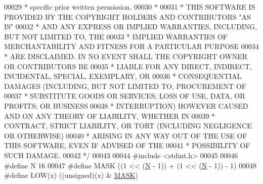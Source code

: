 \begin{DoxyCode}
00029 \textcolor{comment}{ *     specific prior written permission.}
00030 \textcolor{comment}{ *}
00031 \textcolor{comment}{ * THIS SOFTWARE IS PROVIDED BY THE COPYRIGHT HOLDERS AND CONTRIBUTORS "AS IS"}
00032 \textcolor{comment}{ * AND ANY EXPRESS OR IMPLIED WARRANTIES, INCLUDING, BUT NOT LIMITED TO, THE}
00033 \textcolor{comment}{ * IMPLIED WARRANTIES OF MERCHANTABILITY AND FITNESS FOR A PARTICULAR PURPOSE}
00034 \textcolor{comment}{ * ARE DISCLAIMED. IN NO EVENT SHALL THE COPYRIGHT OWNER OR CONTRIBUTORS BE}
00035 \textcolor{comment}{ * LIABLE FOR ANY DIRECT, INDIRECT, INCIDENTAL, SPECIAL, EXEMPLARY, OR}
00036 \textcolor{comment}{ * CONSEQUENTIAL DAMAGES (INCLUDING, BUT NOT LIMITED TO, PROCUREMENT OF}
00037 \textcolor{comment}{ * SUBSTITUTE GOODS OR SERVICES; LOSS OF USE, DATA, OR PROFITS; OR BUSINESS}
00038 \textcolor{comment}{ * INTERRUPTION) HOWEVER CAUSED AND ON ANY THEORY OF LIABILITY, WHETHER IN}
00039 \textcolor{comment}{ * CONTRACT, STRICT LIABILITY, OR TORT (INCLUDING NEGLIGENCE OR OTHERWISE)}
00040 \textcolor{comment}{ * ARISING IN ANY WAY OUT OF THE USE OF THIS SOFTWARE, EVEN IF ADVISED OF THE}
00041 \textcolor{comment}{ * POSSIBILITY OF SUCH DAMAGE.}
00042 \textcolor{comment}{ */}
00043 
00044 \textcolor{preprocessor}{#}\textcolor{preprocessor}{include} \textcolor{preprocessor}{<}\textcolor{preprocessor}{stdint}\textcolor{preprocessor}{.}\textcolor{preprocessor}{h}\textcolor{preprocessor}{>}
00045 
00046 \textcolor{preprocessor}{#}\textcolor{preprocessor}{define} \textcolor{preprocessor}{N}   16
00047 \textcolor{preprocessor}{#}\textcolor{preprocessor}{define} \textcolor{preprocessor}{MASK}    \textcolor{preprocessor}{(}\textcolor{preprocessor}{(}1 \textcolor{preprocessor}{<<} \textcolor{preprocessor}{(}\hyperlink{rand_8c_a0240ac851181b84ac374872dc5434ee4}{N} \textcolor{preprocessor}{-} 1\textcolor{preprocessor}{)}\textcolor{preprocessor}{)} \textcolor{preprocessor}{+} \textcolor{preprocessor}{(}1 \textcolor{preprocessor}{<<} \textcolor{preprocessor}{(}\hyperlink{rand_8c_a0240ac851181b84ac374872dc5434ee4}{N} \textcolor{preprocessor}{-} 1\textcolor{preprocessor}{)}\textcolor{preprocessor}{)} \textcolor{preprocessor}{-} 1\textcolor{preprocessor}{)}
00048 \textcolor{preprocessor}{#}\textcolor{preprocessor}{define} \textcolor{preprocessor}{LOW}\textcolor{preprocessor}{(}\textcolor{preprocessor}{x}\textcolor{preprocessor}{)}  \textcolor{preprocessor}{(}\textcolor{preprocessor}{(}\textcolor{keywordtype}{unsigned}\textcolor{preprocessor}{)}\textcolor{preprocessor}{(}\textcolor{preprocessor}{x}\textcolor{preprocessor}{)} \textcolor{preprocessor}{&} \hyperlink{rand_8c_ae7520c5477c11965aabeedc033c9862b}{MASK}\textcolor{preprocessor}{)}

\end{DoxyCode}
